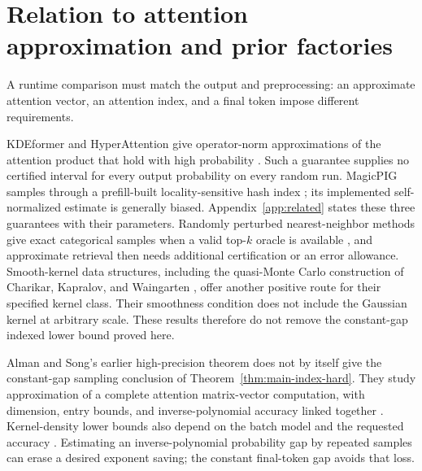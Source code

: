 \section{Relation to attention approximation and prior factories}
\label{sec:prior-main}

A runtime comparison must match the output and preprocessing:
an approximate attention vector, an attention index, and a final
token impose different requirements.

KDEformer and HyperAttention give operator-norm approximations of the
attention product that hold with high probability
\cite{kdeformer2023,hyperattention2023}. Such a guarantee supplies no
certified interval for every output probability on every random run.
MagicPIG samples through a prefill-built locality-sensitive hash index
\cite{magicpig2024}; its implemented self-normalized estimate is
generally biased. Appendix~\ref{app:related} states these three
guarantees with their parameters. Randomly perturbed nearest-neighbor
methods give exact categorical samples when a valid top-$k$ oracle is
available \cite{mussmann2017}, and approximate retrieval then needs
additional certification or an error allowance. Smooth-kernel data
structures, including the quasi-Monte Carlo construction of Charikar,
Kapralov, and Waingarten \cite{charikar2024qmc}, offer another positive
route for their specified kernel class. Their smoothness condition does
not include the Gaussian kernel at arbitrary scale. These results therefore do not remove the
constant-gap indexed lower bound proved here.

Alman and Song's earlier high-precision theorem does not by itself
give the constant-gap sampling conclusion of
Theorem~\ref{thm:main-index-hard}. They study approximation of a
complete attention matrix-vector computation, with dimension, entry
bounds, and inverse-polynomial accuracy linked together
\cite{alman2023attention}. Kernel-density lower bounds also depend on
the batch model and the requested accuracy
\cite{aggarwal2022polynomial,alman2024kde}. Estimating an
inverse-polynomial probability gap by repeated samples can erase a
desired exponent saving; the constant final-token gap avoids that
loss.

